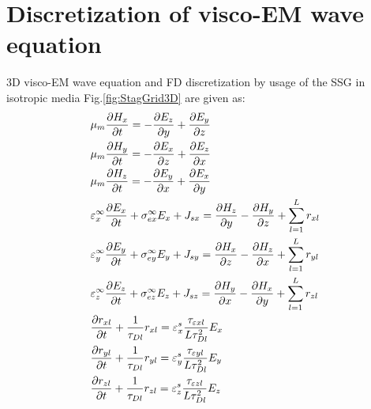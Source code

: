 \documentclass[pdftex,a4paper,parskip,listof=totoc,bibliography=totoc,onehalfspacing,12pt]{scrreprt}
\begin{document}
\section{Discretization of visco-EM wave equation}
3D visco-EM wave equation and FD discretization by usage of the SSG in isotropic media Fig.\ref{fig:StagGrid3D} are given as:
\begin{equation}
\begin{align*}
  &\mu_{m} \pdv{H_{x}}{t} = -\pdv{E_z}{y} + \pdv{E_y}{z}\\
  &\mu_{m} \pdv{H_{y}}{t} = -\pdv{E_x}{z} + \pdv{E_z}{x}\\
  &\mu_{m} \pdv{H_{z}}{t} = -\pdv{E_y}{x} + \pdv{E_x}{y}\\
  &\varepsilon^\infty_{x} \pdv{E_{x}}{t} + \sigma^\infty_{ex} E_{x} + J_{sx} = \pdv{H_z}{y} - \pdv{H_y}{z} + \sum_{l=1}^L r_{xl} \\
  &\varepsilon^\infty_{y} \pdv{E_{y}}{t} + \sigma^\infty_{ey} E_{y} + J_{sy} = \pdv{H_x}{z} - \pdv{H_z}{x} + \sum_{l=1}^L r_{yl} \\
  &\varepsilon^\infty_{z} \pdv{E_{z}}{t} + \sigma^\infty_{ez} E_{z} + J_{sz} = \pdv{H_y}{x} - \pdv{H_x}{y} + \sum_{l=1}^L r_{zl} \\
  &\pdv{r_{xl}}{t} + \frac{1}{\tau_{Dl} } r_{xl} = \varepsilon^s_{x} \frac{\tau_{\varepsilon x l}}{L \tau_{Dl}^2} E_{x}\\
  &\pdv{r_{yl}}{t} + \frac{1}{\tau_{Dl} } r_{yl} = \varepsilon^s_{y} \frac{\tau_{\varepsilon y l}}{L \tau_{Dl}^2} E_{y}\\
  &\pdv{r_{zl}}{t} + \frac{1}{\tau_{Dl} } r_{zl} = \varepsilon^s_{z} \frac{\tau_{\varepsilon z l}}{L \tau_{Dl}^2} E_{z}
\end{align*}
\end{equation}
\end{document}
